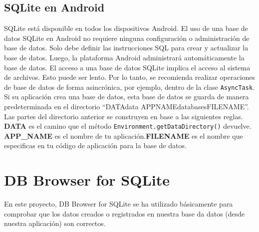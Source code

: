 \subsection{SQLite en Android}
SQLite está disponible en todos los dispositivos Android. El uso de una base de datos SQLite en Android no requiere ninguna configuración o administración de base de datos.
Solo debe definir las instrucciones SQL para crear y actualizar la base de datos. Luego, la plataforma Android administrará automáticamente la base de datos.
El acceso a una base de datos SQLite implica el acceso al sistema de archivos. Esto puede ser lento. Por lo tanto, se recomienda realizar operaciones de base de datos de forma asincrónica, por ejemplo, dentro de la clase \texttt{AsyncTask}. Si su aplicación crea una base de datos, esta base de datos se guarda de manera predeterminada en el directorio ``DATA\/data\/ APP\/NAME\/databases\/FILENAME''. Las partes del directorio anterior se construyen en base a las siguientes reglas. \textbf{DATA} es el camino que el método \texttt{Environment.getDataDirectory()} devuelve. \textbf{APP\_NAME} es el nombre de tu aplicación.\textbf{FILENAME} es el nombre que especificas en tu código de aplicación para la base de datos.

\section{DB Browser for SQLite}
En este proyecto, DB Browser for SQLite se ha utilizado básicamente para comprobar que los datos creados o registrados en nuestra base da datos (desde nuestra aplicación) son correctos.
